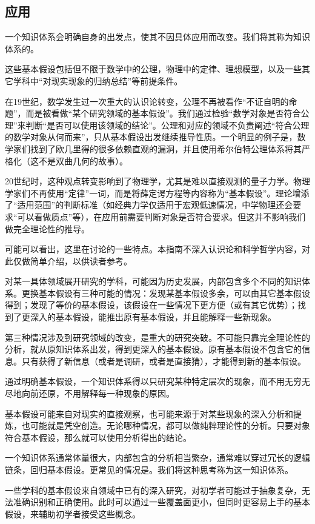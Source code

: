 \subsection{应用}
\label{def:知识体系}一个知识体系会明确自身的出发点，使其不因具体应用而改变。我们将其称为知识体系的。
\begin{examples}
这些基本假设包括但不限于数学中的公理，物理中的定律、理想模型，以及一些其它学科中“对现实现象的归纳总结”等前提条件。

在19世纪，数学发生过一次重大的认识论转变，公理不再被看作“不证自明的命题”，而是被看做“某个研究领域的基本假设”。我们通过检验“数学对象是否符合公理”来判断“是否可以使用该领域的结论”。公理和对应的领域不负责阐述“符合公理的数学对象从何而来”，只从基本假设出发继续推导性质。一个明显的例子是，数学家们找到了欧几里得的很多依赖直观的漏洞，并且使用希尔伯特公理体系将其严格化（这不是双曲几何的故事）。

20世纪时，这种观点转变影响到了物理学，尤其是难以直接观测的量子力学。物理学家们不再使用“定律”一词，而是将薛定谔方程等内容称为“基本假设”。理论增添了“适用范围”的判断标准（如经典力学仅适用于宏观低速情况，中学物理还会要求“可以看做质点”等），在应用前需要判断对象是否符合要求。但这并不影响我们做完全理论性的推导。

\trained 可能可以看出，这里在讨论的一些特点。本指南不深入认识论和科学哲学内容，对此仅做简单介绍，以供读者参考。
\end{examples}
对某一具体领域展开研究的学科，可能因为历史发展，内部包含多个不同的知识体系。更换基本假设有三种可能的情况：发现某基本假设多余，可以由其它基本假设得到；发现了等价的基本假设，该假设在一些情况下更方便（或有其它优势）；找到了更深入的基本假设，能推出原有基本假设，并且能解释一些新现象。
\begin{examples}
第三种情况涉及到研究领域的改变，是重大的研究突破。不可能只靠完全理论性的分析，就从原知识体系出发，得到更深入的基本假设。原有基本假设不包含它的信息。只有获得了新信息（或者是调研，或者是直接猜），才能得到新的基本假设。
\end{examples}通过明确基本假设，一个知识体系得以只研究某种特定层次的现象，而不用无穷无尽地向前还原，不用解释每一种现象的原因。
\begin{examples}
基本假设可能来自对现实的直接观察，也可能来源于对某些现象的深入分析和提炼，也可能就是凭空创造。无论哪种情况，都可以做纯粹理论性的分析。只要对象符合基本假设，那么就可以使用分析得出的结论。

\end{examples}
一个知识体系通常体量很大，内部包含的分析相当繁杂，通常难以穿过冗长的逻辑链条，回归基本假设。更常见的情况是。我们将这种思考称为这一知识体系。
\begin{examples}
一些学科的基本假设来自领域中已有的深入研究，对初学者可能过于抽象复杂，无法准确识别和正确使用。此时可以通过一些覆盖面更小，但同时更容易上手的基本假设，来辅助初学者接受这些概念。
\end{examples}

